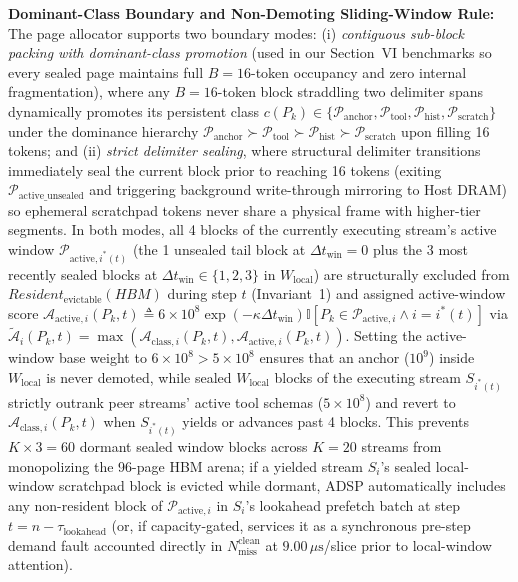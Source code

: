 \documentclass[conference,10pt]{IEEEtran}
\begin{document}
\textbf{Dominant-Class Boundary and Non-Demoting Sliding-Window Rule:} The page allocator supports two boundary modes: (i) \textit{contiguous sub-block packing with dominant-class promotion} (used in our Section~VI benchmarks so every sealed page maintains full $B=16$-token occupancy and zero internal fragmentation), where any $B=16$-token block straddling two delimiter spans dynamically promotes its persistent class $c(P_k) \in \{\mathcal{P}_{\text{anchor}}, \mathcal{P}_{\text{tool}}, \mathcal{P}_{\text{hist}}, \mathcal{P}_{\text{scratch}}\}$ under the dominance hierarchy $\mathcal{P}_{\text{anchor}} \succ \mathcal{P}_{\text{tool}} \succ \mathcal{P}_{\text{hist}} \succ \mathcal{P}_{\text{scratch}}$ upon filling 16 tokens; and (ii) \textit{strict delimiter sealing}, where structural delimiter transitions immediately seal the current block prior to reaching 16 tokens (exiting $\mathcal{P}_{\text{active\_unsealed}}$ and triggering background write-through mirroring to Host DRAM) so ephemeral scratchpad tokens never share a physical frame with higher-tier segments. In both modes, all 4 blocks of the currently executing stream's active window $\mathcal{P}_{\text{active}, i^*(t)}$ (the 1 unsealed tail block at $\Delta t_{\text{win}} = 0$ plus the 3 most recently sealed blocks at $\Delta t_{\text{win}} \in \{1, 2, 3\}$ in $W_{\text{local}}$) are structurally excluded from $\textit{Resident}_{\text{evictable}}(\textit{HBM})$ during step $t$ (Invariant~1) and assigned active-window score $\mathcal{A}_{\text{active}, i}(P_k, t) \triangleq 6 \times 10^8\exp(-\kappa \Delta t_{\text{win}})\mathbb{I}[P_k \in \mathcal{P}_{\text{active},i} \wedge i = i^*(t)]$ via $\tilde{\mathcal{A}}_i(P_k, t) = \max(\mathcal{A}_{\text{class}, i}(P_k, t), \mathcal{A}_{\text{active}, i}(P_k, t))$. Setting the active-window base weight to $6 \times 10^8 > 5 \times 10^8$ ensures that an anchor ($10^9$) inside $W_{\text{local}}$ is never demoted, while sealed $W_{\text{local}}$ blocks of the executing stream $S_{i^*(t)}$ strictly outrank peer streams' active tool schemas ($5 \times 10^8$) and revert to $\mathcal{A}_{\text{class}, i}(P_k, t)$ when $S_{i^*(t)}$ yields or advances past 4 blocks. This prevents $K \times 3 = 60$ dormant sealed window blocks across $K=20$ streams from monopolizing the 96-page HBM arena; if a yielded stream $S_i$'s sealed local-window scratchpad block is evicted while dormant, ADSP automatically includes any non-resident block of $\mathcal{P}_{\text{active}, i}$ in $S_i$'s lookahead prefetch batch at step $t = n - \tau_{\text{lookahead}}$ (or, if capacity-gated, services it as a synchronous pre-step demand fault accounted directly in $N_{\text{miss}}^{\text{clean}}$ at $9.00\,\mu\text{s}$/slice prior to local-window attention).
\end{document}
